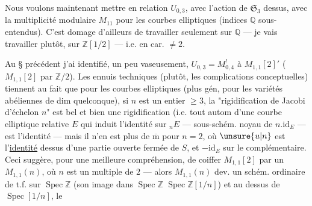 
Nous voulons maintenant mettre en
relation $U_{0,3}$, avec l'action de $\mathfrak{S}_3$
dessus, avec la multiplicité modulaire
$M_{11}$ pour les courbes elliptiques
(indices $\mathbb{Q}$ sous-entendus). C'est
domage d'ailleurs de travailler seulement sur $\mathbb{Q}$ --- je vais travailler
plutôt, sur $\mathbb{Z}[1/2]$ --- i.e. en car.  $\ne 2$.


Au \S{} précédent j'ai identifié, un peu
vaseusement, $U_{0,3}=M^{!}_{0,4}$\unsure{,} à $M_{1,1}[2]'$\unsure{,}
( $M_{1,1}[2]$
 par
$\mathbb{Z}/2$). Les ennuis techniques (plutôt,
les complications conceptuelles) tiennent
au fait que pour les courbes elliptiques
(plus gén, pour les variétés abéliennes de
dim quelconque), si $n$ est un entier $\ge 3$,
la "rigidification de Jacobi d'échelon $n$" est
bel et bien une rigidification (i.e.
tout autom d'une courbe elliptique
relative $E$ qui induit l'identité sur
${}_nE$ --- sous-schém. noyau de $n.\mathrm{id}_E$ --- est
l'identité --- mais il n'en est plus de
$\overline{\mathrm m}$ pour $n=2$, où $\unsure{u|n}$ est l'\uline{identité}  dessus
d'une partie ouverte fermée de $S$, et $-\mathrm{id}_E$
sur le complémentaire. Ceci suggère, pour
une meilleure compréhension, de coiffer
$M_{1,1}[2]$ par un $M_{1,1}(n)$, où $n$ est un
multiple de $2$ --- alors $M_{1,1}(n)$ dev. un
schém. ordinaire de t.f. sur $\operatorname{Spec}\mathbb{Z}$
(son image dans $\operatorname{Spec}\mathbb{Z}$   $\operatorname{Spec}\mathbb{Z}[1/n]$)
et au dessus de $\operatorname{Spec}[1/n]$, le 


